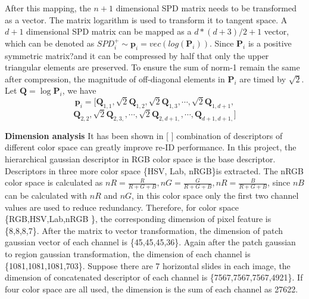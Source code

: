 After this mapping, the $n+1$ dimensional SPD matrix needs to be transformed as a vector. The matrix logarithm is used to transform it to tangent space. A $d+1$ dimensional SPD matrix can be mapped as a $d*(d+3)/2+1$ vector, which can be denoted as $SPD_i^+ \sim \bm{p}_i = vec(log(\bm{P}_i))$. Since $\bm{P}_i$ is a positive symmetric matrix?and it can be compressed by half that only the upper triangular 
elements are preserved. To ensure the sum of norm-1 remain the same after compression, the magnitude of off-diagonal elements in $\bm{P}_i$ are timed by $\sqrt2$.  Let $\bm{Q}=\log{\bm{P}_i}$, we have
\begin{equation}
 \bm{p}_i = [\bm{Q}_{1,1},\sqrt2\bm{Q}_{1,2},\sqrt2\bm{Q}_{1,3},\cdots,\sqrt2\bm{Q}_{1,d+1},
 \end{equation}
 \begin{equation}
 \bm{Q}_{2,2},\sqrt2\bm{Q}_{2,3,},\cdots,\sqrt2\bm{Q}_{2,d+1,},\cdots,\bm{Q}_{d+1,d+1,}]
\end{equation}

\textbf{Dimension analysis} It has been shown in [ ]  combination of descriptors of different color space can greatly improve re-ID performance. In this project, the hierarchical gaussian descriptor in RGB color space is the base descriptor. Descriptors in three more color space \{HSV, Lab, nRGB\}is extracted. The nRGB color space is calculated as $nR = \frac{R}{R+G+B},nG = \frac{G}{R+G+B},nR = \frac{B}{R+G+B}$, since $nB$ can be calculated with $nR$ and $nG$, in this color space only the first two channel values are used to reduce redundancy. Therefore, for color space \{RGB,HSV,Lab,nRGB \}, the corresponding dimension of pixel feature is \{8,8,8,7\}. After the matrix to vector transformation, the dimension of patch gaussian vector of each channel is \{45,45,45,36\}. Again after the patch gaussian to region gaussian transformation, the dimension of each channel is \{1081,1081,1081,703\}. Suppose there are 7 horizontal slides in each image, the dimension of concatenated descriptor of each channel is \{7567,7567,7567,4921\}. If four color space are all used, the dimension is the sum of each channel as 27622. 